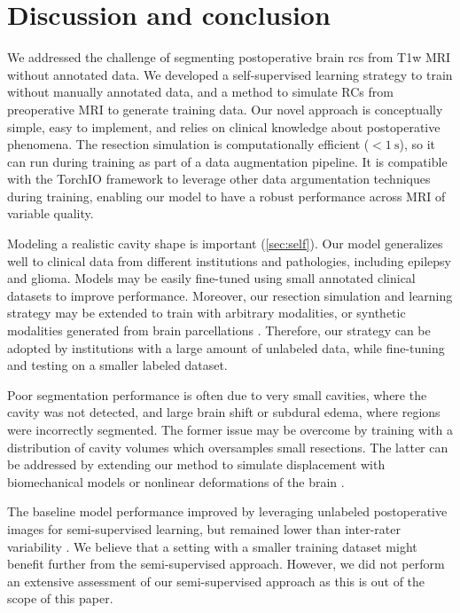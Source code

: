 \section{Discussion and conclusion}
\label{sec:discussion}

We addressed the challenge of segmenting postoperative brain \acp{rc} from \ac{T1w} \ac{MRI} without annotated data.
We developed a self-supervised learning strategy to train without manually annotated data, and a method to simulate \acp{RC} from preoperative \ac{MRI} to generate training data.
Our novel approach is conceptually simple, easy to implement, and relies on clinical knowledge about postoperative phenomena.
The resection simulation is computationally efficient ($< \SI{1}{\second}$), so it can run during training as part of a data augmentation pipeline.
It is compatible with the TorchIO framework \cite{perez-garcia_torchio_2021} to leverage other data argumentation techniques during training, enabling our model to have a robust performance across \ac{MRI} of variable quality.

Modeling a realistic cavity shape is important (\cref{sec:self}).
Our model generalizes well to clinical data from different institutions and pathologies, including epilepsy and glioma.
Models may be easily fine-tuned using small annotated clinical datasets to improve performance.
Moreover, our resection simulation and learning strategy may be extended to train with arbitrary modalities, or synthetic modalities generated from brain parcellations \cite{billot_learning_2020}.
Therefore, our strategy can be adopted by institutions with a large amount of unlabeled data, while fine-tuning and testing on a smaller labeled dataset.

Poor segmentation performance is often due to very small cavities, where the cavity was not detected, and large brain shift or subdural edema, where regions were incorrectly segmented.
The former issue may be overcome by training with a distribution of cavity volumes which oversamples small resections.
The latter can be addressed by extending our method to simulate displacement with biomechanical models or nonlinear deformations of the brain \cite{granados_generative_2021}.

The baseline model performance improved by leveraging unlabeled postoperative images for semi-supervised learning, but remained lower than inter-rater variability \cite{perez-garcia_simulation_2020}.  %
We believe that a setting with a smaller training dataset might benefit further from the semi-supervised approach.
However, we did not perform an extensive assessment of our semi-supervised approach as this is out of the scope of this paper.

